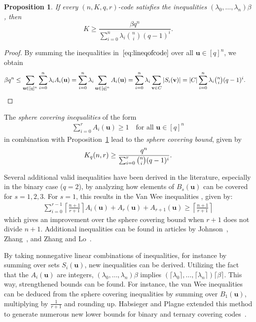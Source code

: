 \documentclass[10pt,a4paper]{article}
\newtheorem{proposition}[theorem]{Proposition}
\theoremstyle{definition}
\newcommand{\uu}{\mathbf{u}}
\newcommand{\vv}{\mathbf{v}}
\begin{document}
\begin{proposition} \label{prop:lowerboundineq}
If every $(n, K, q, r)$-code satisfies the inequalities $(\lambda_0, \ldots, \lambda_n) \beta$, then  
\[
K \geq \frac{\beta q^n}{\sum_{i=0}^n \lambda_i \binom{n}{i} (q - 1)^i}.  
\] 
\end{proposition}  

\begin{proof}  
By summing the inequalities in~$\eqref{eq:lineqofcode}$ over all $\uu \in [q]^n$, we obtain  
\begin{align*}  
\beta q^n \leq \sum_{\uu \in [q]^n} \sum_{i=0}^n \lambda_i A_i(\uu)
&= \sum_{i=0}^n \lambda_i \sum_{\uu \in [q]^n} A_i(\uu)
= \sum_{i=0}^n \lambda_i \sum_{\vv \in C} |S_i(\vv)| 
= |C| \sum_{i=0}^n \lambda_i \tbinom{n}{i} (q - 1)^i. \qedhere  
\end{align*}  
\end{proof}  
The \emph{sphere covering inequalities} of the form  
\begin{align}
\sum_{i=0}^r A_i(\uu) \geq 1 \quad \text{for all } \uu \in [q]^n 
\end{align}
in combination with Proposition~\ref{prop:lowerboundineq} lead to the \emph{sphere covering bound}, given by  
\begin{align}
K_q(n, r) \geq \frac{q^n}{\sum_{i=0}^r \tbinom{n}{i} (q - 1)^i}.  
\end{align}

Several additional valid inequalities have been derived in the literature, especially in the binary case ($q = 2$), by analyzing how elements of $B_s(\uu)$ can be covered for $s = 1, 2, 3$. For $s = 1$, this results in the Van Wee inequalities \cite{VanWee88, VanWeeThesis}, given by:  
\begin{align}
\sum_{i=0}^{r-1} \left\lceil \frac{n+1}{r+1} \right\rceil A_i(\uu) + A_r(\uu) + A_{r+1}(\uu) \geq \left\lceil \frac{n+1}{r+1} \right\rceil  
\end{align}
which gives an improvement over the sphere covering bound when $r + 1$ does not divide $n + 1$.  
Additional inequalities can be found in articles by Johnson~\cite{Johnson72}, Zhang~\cite{Zhang91}, and Zhang and Lo~\cite{ZL92}.  

By taking nonnegative linear combinations of inequalities, for instance by summing over sets $S_i(\uu)$, new inequalities can be derived. Utilizing the fact that the $A_i(\uu)$ are integers, $(\lambda_0, \ldots, \lambda_n) \beta$ implies $(\lceil \lambda_0 \rceil, \ldots, \lceil \lambda_n \rceil) \lceil \beta \rceil$. This way, strengthened bounds can be found. For instance, the van Wee inequalities can be deduced from the sphere covering inequalities by summing over $B_1(\uu)$, multiplying by $\tfrac{1}{r+1}$ and rounding up. Habsieger and Plagne extended this method to generate numerous new lower bounds for binary and ternary covering codes~\cite{HP00}.  
\end{document}
